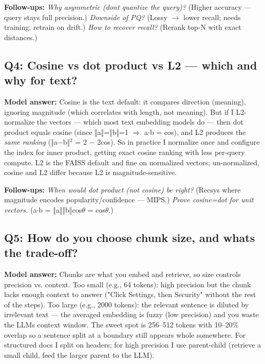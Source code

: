 \documentclass[11pt]{article}
\begin{document}
\textbf{Follow-ups:} \emph{Why asymmetric (don\textquotesingle t quantize the query)?} (Higher accuracy --- query stays full precision.) \emph{Downside of PQ?} (Lossy \(\rightarrow\) lower recall; needs training; retrain on drift.) \emph{How to recover recall?} (Rerank top-N with exact distances.)

\subsection{Q4: Cosine vs dot product vs L2 --- which and why for text?}\label{q4-cosine-vs-dot-product-vs-l2--which-and-why-for-text}

\textbf{Model answer:} Cosine is the text default: it compares direction (meaning), ignoring magnitude (which correlates with length, not meaning). But if I L2-normalize the vectors --- which most text embedding models do --- then dot product equals cosine (since ‖a‖=‖b‖=1 \(\Rightarrow\) a\(\cdot\)b = cos), and L2 produces the \emph{same ranking} (‖a\(-\)b‖\(^2\) = 2 \(-\) 2cos). So in practice I normalize once and configure the index for inner product, getting exact cosine ranking with less per-query compute. L2 is the FAISS default and fine on normalized vectors; un-normalized, cosine and L2 differ because L2 is magnitude-sensitive.

\textbf{Follow-ups:} \emph{When would dot product (not cosine) be right?} (Recsys where magnitude encodes popularity/confidence --- MIPS.) \emph{Prove cosine=dot for unit vectors.} (a\(\cdot\)b = ‖a‖‖b‖cos\(\theta\) = cos\(\theta\).)

\subsection{Q5: How do you choose chunk size, and what\textquotesingle s the trade-off?}\label{q5-how-do-you-choose-chunk-size-and-whats-the-trade-off}

\textbf{Model answer:} Chunks are what you embed and retrieve, so size controls precision vs. context. Too small (e.g., 64 tokens): high precision but the chunk lacks enough context to answer ("Click Settings, then Security" without the rest of the steps). Too large (e.g., 2000 tokens): the relevant sentence is diluted by irrelevant text --- the averaged embedding is fuzzy (low precision) and you waste the LLM\textquotesingle s context window. The sweet spot is 256--512 tokens with 10--20\% overlap so a sentence split at a boundary still appears whole somewhere. For structured docs I split on headers; for high precision I use parent-child (retrieve a small child, feed the larger parent to the LLM).
\end{document}
